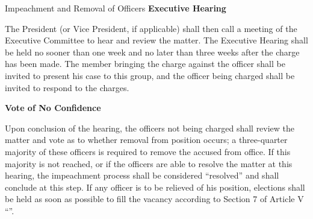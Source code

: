 {\begin{article}{Impeachment and Removal of Officers}
		\hypertarget{Executive Hearing}{}
		\textbf{Executive Hearing}
		
		\begin{adjustwidth*}{2em}{}
			The President (or Vice President, if applicable) shall then call a meeting of the Executive Committee to hear and review the matter. The Executive Hearing shall be held no sooner than one week and no later than three weeks after the charge has been made. The member bringing the charge against the officer shall be invited to present his case to this group, and the officer being charged shall be invited to respond to the charges.
		\end{adjustwidth*}
	
		\hypertarget{Vote of No Confidence}{}
		\textbf{Vote of No Confidence}
		
		\begin{adjustwidth*}{2em}{}
			Upon conclusion of the hearing, the officers not being charged shall review the matter and vote as to whether removal from position occurs; a three-quarter majority of these officers is required to remove the accused from office. If this majority is not reached, or if the officers are able to resolve the matter at this hearing, the impeachment process shall be considered \enquote{resolved} and shall conclude at this step. If any officer is to be relieved of his position, elections shall be held as soon as possible to fill the vacancy according to Section 7 of Article V \enquote{}.
		\end{adjustwidth*}
	\end{article}
}